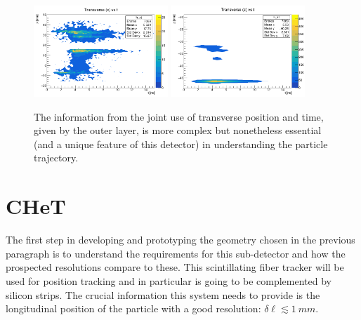 \begin{refsection}
\begin{figure}
    \centering
    \includegraphics[width=0.45\textwidth]{Figures/muEDM/Tracker/fPosInXfTimeIn.png}
    \includegraphics[width=0.45\textwidth]{Figures/muEDM/Tracker/fPosInZfTimeIn.png}
    \caption{The information from the joint use of transverse position and time, given by the outer layer, is more complex but nonetheless essential (and a unique feature of this detector) in understanding the particle trajectory.
}
    \label{fig:geant4_time_pos_transverse}
\end{figure}

\section{CHeT}
    The first step in developing and prototyping the geometry chosen in the previous paragraph is to understand the requirements for this sub-detector and how the prospected resolutions compare to these.
    This scintillating fiber tracker will be used for position tracking and in particular is going to be complemented by silicon strips. The crucial information this system needs to provide is the longitudinal position of the particle with a good resolution: $\delta \ell \lesssim \SI{1}{mm}$.


\end{refsection}
